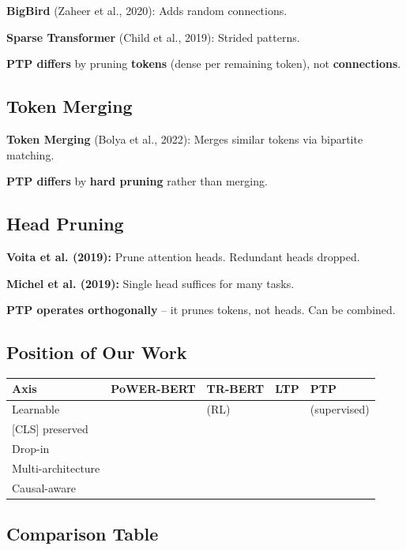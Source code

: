 {\textbf{BigBird} (Zaheer et al., 2020): Adds random connections.

\textbf{Sparse Transformer} (Child et al., 2019): Strided patterns.

\textbf{PTP differs} by pruning \textbf{tokens} (dense per remaining token), not 
\textbf{connections}.

\subsection{Token Merging}

\textbf{Token Merging} (Bolya et al., 2022): Merges similar tokens via bipartite 
matching.

\textbf{PTP differs} by \textbf{hard pruning} rather than merging.

\subsection{Head Pruning}

\textbf{Voita et al. (2019):} Prune attention heads. Redundant heads dropped.

\textbf{Michel et al. (2019):} Single head suffices for many tasks.

\textbf{PTP operates orthogonally} -- it prunes tokens, not heads. Can be combined.

\subsection{Position of Our Work}

\begin{table}[H]
\centering
\small
\begin{tabular}{lllll}
\toprule
\textbf{Axis} & \textbf{PoWER-BERT} & \textbf{TR-BERT} & \textbf{LTP} & \textbf{PTP} \\
\midrule
Learnable &  & (RL) &  & (supervised) \\
 {[}CLS] preserved &  &  &  &  \\
Drop-in &  &  &  &  \\
Multi-architecture &  &  &  &  \\
Causal-aware &  &  &  &  \\
\bottomrule
\end{tabular}
\end{table}

\subsection{Comparison Table}

}
